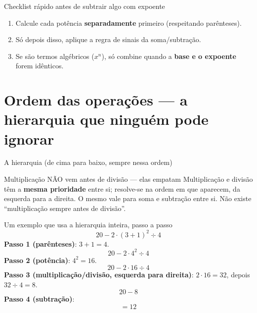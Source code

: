 \documentclass[12pt,a4paper]{article}
\begin{document}
\begin{macete}{Checklist rápido antes de subtrair algo com expoente}
\begin{enumerate}[nosep]
  \item Calcule cada potência \textbf{separadamente} primeiro (respeitando parênteses).
  \item Só depois disso, aplique a regra de sinais da soma/subtração.
  \item Se são termos algébricos ($x^n$), só combine quando a \textbf{base e o expoente} forem idênticos.
\end{enumerate}
\end{macete}

\section{Ordem das operações — a hierarquia que ninguém pode ignorar}

\begin{definicao}{A hierarquia (de cima para baixo, sempre nessa ordem)}
\begin{center}
\end{center}
\end{definicao}

\begin{atencao}{Multiplicação NÃO vem antes de divisão — elas empatam}
Multiplicação e divisão têm a \textbf{mesma prioridade} entre si; resolve-se
na ordem em que aparecem, da esquerda para a direita. O mesmo vale para
soma e subtração entre si. Não existe ``multiplicação sempre antes de
divisão''.
\end{atencao}

\begin{exemplo}{Um exemplo que usa a hierarquia inteira, passo a passo}
\[
20 - 2\cdot(3+1)^2 \div 4
\]
\textbf{Passo 1 (parênteses)}: $3+1=4$.
\[
20 - 2\cdot 4^2 \div 4
\]
\textbf{Passo 2 (potência)}: $4^2=16$.
\[
20 - 2\cdot 16 \div 4
\]
\textbf{Passo 3 (multiplicação/divisão, esquerda para direita)}: $2\cdot16=32$, depois $32\div4=8$.
\[
20 - 8
\]
\textbf{Passo 4 (subtração)}:
\[
= 12
\]
\end{exemplo}
\end{document}
